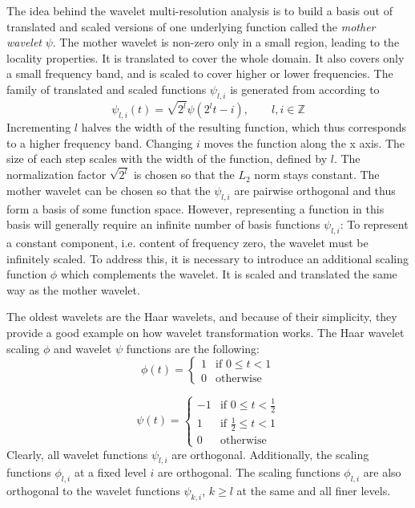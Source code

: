 \documentclass{diploma_style}
\begin{document}
The idea behind the wavelet multi-resolution analysis is to build a basis out of translated and scaled versions of one underlying function called the \textit{mother wavelet} $\psi$. The mother wavelet is non-zero only in a small region, leading to the locality properties. It is translated to cover the whole domain. It also covers only a small frequency band, and is scaled to cover higher or lower frequencies. The family of translated and scaled functions $\psi_{l,i}$ is generated from   according to
\begin{equation}
\psi_{l,i}(t) = \sqrt{2^l} \psi \left(2^l t-i\right), \qquad l, i \in \mathbb{Z}
\end{equation}
Incrementing $l$ halves the width of the resulting function, which thus corresponds to a higher frequency band. Changing $i$ moves the function along the x axis. The size of each step scales with the width of the function, defined by $l$. The normalization factor $\sqrt{2^l}$ is chosen so that the $L_2$ norm stays constant. The mother wavelet can be chosen so that the $\psi_{l,i}$ are pairwise orthogonal and thus form a basis of some function space. However, representing a function in this basis will generally require an infinite number of basis functions $\psi_{l,i}$: To represent a constant component, i.e. content of frequency zero, the wavelet must be infinitely scaled. To address this, it is necessary to introduce an additional scaling function $\phi$ which complements the wavelet. It is scaled and translated the same way as the mother wavelet.

The oldest wavelets are the Haar wavelets, and because of their simplicity, they provide a good example on how wavelet transformation works. The Haar wavelet scaling $\phi$ and wavelet $\psi$ functions are the following:
\begin{equation}
\phi(t) = 
\begin{cases}
    1 & \text{if } 0 \leq t < 1 \\
    0 & \text{otherwise}
\end{cases}
\label{eq:scaling}
\end{equation}

\begin{equation}
\psi(t) = 
\begin{cases}
    -1 & \text{if } 0 \leq t < \frac{1}{2} \\
    1 & \text{if } \frac{1}{2} \leq t < 1 \\
    0 & \text{otherwise}
\end{cases}
\label{eq:wavelet}
\end{equation}
Clearly, all wavelet functions $\psi_{l,i}$ are orthogonal. Additionally, the scaling functions $\phi_{l,i}$ at a fixed level $i$ are orthogonal. The scaling functions $\phi_{l,i}$ are also orthogonal to the wavelet functions $\psi_{k,i}$, $k \geq l$ at the same and all finer levels.
\end{document}
